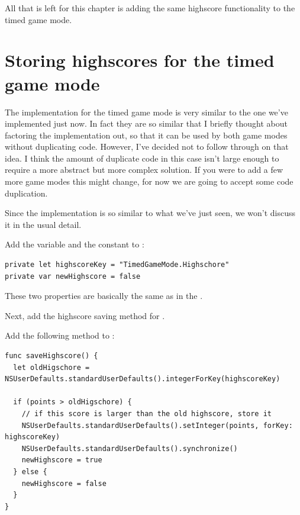 All that is left for this chapter is adding the same highscore functionality to
the timed game mode.

\section{Storing highscores for the timed game mode}
The implementation for the timed game mode is very similar to the one we've
implemented just now. In fact they are so similar that I briefly thought about
factoring the implementation out, so that it can be used by both game modes
without duplicating code. However, I've decided not to follow through on that
idea. I think the amount of duplicate code in this case isn't large enough to
require a more abstract but more complex solution. If you were to add a few more
game modes this might change, for now we are going to accept some code
duplication.

Since the implementation is so similar to what we've just seen, we won't discuss
it in the usual detail.

\begin{leftbar}
Add the  variable and the 
constant to :
\begin{lstlisting}
private let highscoreKey = "TimedGameMode.Highschore"
private var newHighscore = false
\end{lstlisting}
\end{leftbar}
These two properties are basically the same as in the
. 

Next, add the highscore saving method for .

\begin{leftbar}
Add the following method to :
\begin{lstlisting}
func saveHighscore() {
  let oldHigschore = NSUserDefaults.standardUserDefaults().integerForKey(highscoreKey)
  
  if (points > oldHigschore) {
    // if this score is larger than the old highscore, store it
    NSUserDefaults.standardUserDefaults().setInteger(points, forKey: highscoreKey)
    NSUserDefaults.standardUserDefaults().synchronize()
    newHighscore = true
  } else {
    newHighscore = false
  }
}
\end{lstlisting}
\end{leftbar}

